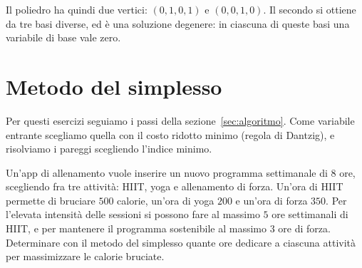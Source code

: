 Il poliedro ha quindi due vertici: $(0, 1, 0, 1)$ e $(0, 0, 1, 0)$. Il secondo si ottiene da tre basi diverse, ed è una soluzione degenere: in ciascuna di queste basi una variabile di base vale zero.

\section{Metodo del simplesso}\label{sec:es-simplesso}
Per questi esercizi seguiamo i passi della sezione~\ref{sec:algoritmo}. Come variabile entrante scegliamo quella con il costo ridotto minimo (regola di Dantzig), e risolviamo i pareggi scegliendo l'indice minimo.

\begin{esercizio}
Un'app di allenamento vuole inserire un nuovo programma settimanale di $8$ ore, scegliendo fra tre attività: HIIT, yoga e allenamento di forza. Un'ora di HIIT permette di bruciare $500$ calorie, un'ora di yoga $200$ e un'ora di forza $350$. Per l'elevata intensità delle sessioni si possono fare al massimo $5$ ore settimanali di HIIT, e per mantenere il programma sostenibile al massimo $3$ ore di forza. Determinare con il metodo del simplesso quante ore dedicare a ciascuna attività per massimizzare le calorie bruciate.
\end{esercizio}


